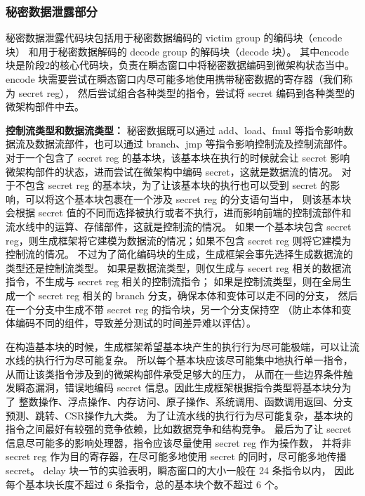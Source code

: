\subsubsection{秘密数据泄露部分}

秘密数据泄露代码块包括用于秘密数据编码的 victim group 的编码块（encode 块）
和用于秘密数据解码的 decode group 的解码块（decode 块）。
其中encode 块是阶段2的核心代码块，负责在瞬态窗口中将秘密数据编码到微架构状态当中。
encode 块需要尝试在瞬态窗口内尽可能多地使用携带秘密数据的寄存器（我们称为 secret reg），
然后尝试组合各种类型的指令，尝试将 secret 编码到各种类型的微架构部件中去。\par

\textbf{控制流类型和数据流类型：}
秘密数据既可以通过 add、load、fmul 等指令影响数据流及数据流部件，也可以通过 branch、jmp 等指令影响控制流及控制流部件。
对于一个包含了 secret reg 的基本块，该基本块在执行的时候就会让 secret 影响微架构部件的状态，进而尝试在微架构中编码 secret，这就是数据流的情况。
对于不包含 secret reg 的基本块，为了让该基本块的执行也可以受到 secret 的影响，可以将这个基本块包裹在一个涉及 secret reg 的分支语句当中，
则该基本块会根据 secret 值的不同而选择被执行或者不执行，进而影响前端的控制流部件和流水线中的运算、存储部件，这就是控制流的情况。
如果一个基本块包含 secret reg，则生成框架将它建模为数据流的情况；如果不包含 secret reg 则将它建模为控制流的情况。
不过为了简化编码块的生成，生成框架会事先选择生成数据流的类型还是控制流类型。
如果是数据流类型，则仅生成与 secert reg 相关的数据流指令，不生成与 secret reg 相关的控制流指令；
如果是控制流类型，则在全局生成一个 secret reg 相关的 branch 分支，确保本体和变体可以走不同的分支，
然后在一个分支中生成不带 secret reg 的指令块，另一个分支保持空
（防止本体和变体编码不同的组件，导致差分测试的时间差异难以评估）。\par

在构造基本块的时候，生成框架希望基本块产生的执行行为尽可能极端，可以让流水线的执行行为尽可能复杂。
所以每个基本块应该尽可能集中地执行单一指令，从而让该类指令涉及到的微架构部件承受足够大的压力，
从而在一些边界条件触发瞬态漏洞，错误地编码 secret 信息。因此生成框架根据指令类型将基本块分为了
整数操作、浮点操作、内存访问、原子操作、系统调用、函数调用返回、分支预测、跳转、CSR操作九大类。
为了让流水线的执行行为尽可能复杂，基本块的指令之间最好有较强的竞争依赖，比如数据竞争和结构竞争。
最后为了让 secret 信息尽可能多的影响处理器，指令应该尽量使用 secret reg 作为操作数，
并将非 secret reg 作为目的寄存器，在尽可能多地使用 secret 的同时，尽可能多地传播 secret。
delay 块一节的实验表明，瞬态窗口的大小一般在 24 条指令以内，
因此每个基本块长度不超过 6 条指令，总的基本块个数不超过 6 个。\par

